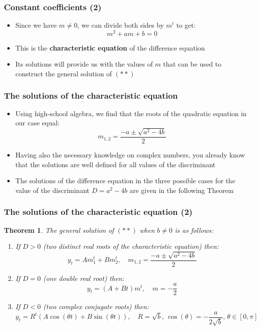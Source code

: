 \documentclass[10pt,usenames,dvipsnames]{beamer}
\theoremstyle{plain}
\newtheorem{thm}{Theorem}
\theoremstyle{definition}
\begin{document}
\begin{frame}[fragile]
\frametitle{Constant coefficients (2)}
\begin{itemize}
	\item Since we have $ m \neq 0 $, we can divide both sides by $ m^t $ to get:
	\[
		m^{2} + am + b = 0
	\]
	\item This is the \textbf{characteristic equation} of the difference equation
	\item Its solutions will provide us with the values of $m$ that can be used to construct the general solution of $(**)$
\end{itemize}
\end{frame}

\begin{frame}[fragile]
\frametitle{The solutions of the characteristic equation}
\begin{itemize}
	\item Using high-school algebra, we find that the roots of the quadratic equation in our case equal:
	\[
		m_{1,2} = \frac{- a \pm \sqrt{a^{2} - 4b}}{2}
	\]
	\item Having also the necessary knowledge on complex numbers, you already know that the solutions are well defined for all values of the discriminant
	\item The solutions of the difference equation in the three possible cases for the value of the discriminant $D = a^{2} - 4b$ are given in the following Theorem
\end{itemize}
\end{frame}

\begin{frame}[fragile]
\frametitle{The solutions of the characteristic equation (2)}
\begin{thm}
	The general solution of $(**)$ when $b \neq 0$ is as follows:
	\begin{enumerate}
	 	\item If $D > 0$ (two distinct real roots of the characteristic equation) then:
	 	\[
	 		y_{t} = A m_{1}^{t} + B m_{2}^{t}, \quad m_{1,2} = \frac{- a \pm \sqrt{a^{2} - 4b}}{2}
	 	\]
	 	\item If $D = 0$ (one double real root) then:
	 	\[
	 		y_{t} = (A + Bt) m^{t}, \quad m = -\frac{a}{2}
	 	\]
	 	\item If $D < 0$ (two complex conjugate roots) then:
	 	\[
	 		y_{t} = R^{t}(A\cos(\theta t) + B\sin(\theta t)), \quad R = \sqrt{b},\, \cos(\theta) = -\frac{a}{2\sqrt{b}},\, \theta \in [0,\pi]
	 	\]
	\end{enumerate} 
\end{thm}
\end{frame}
\end{document}
